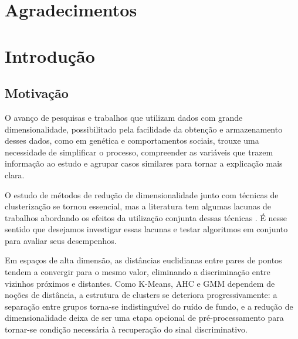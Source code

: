 \documentclass[12pt,a4paper]{report}
\begin{document}
\chapter*{Agradecimentos}


\newpage

\tableofcontents
\newpage

\setcounter{page}{1}

\chapter{Introdução}

\section{Motivação}

O avanço de pesquisas e trabalhos que utilizam dados com grande
dimensionalidade, possibilitado pela facilidade da obtenção e armazenamento
desses dados, como em genética e comportamentos sociais, trouxe uma
necessidade de simplificar o processo, compreender as variáveis que trazem
informação ao estudo e agrupar casos similares para tornar a explicação mais
clara.

O estudo de métodos de redução de dimensionalidade junto com técnicas de
clusterização se tornou essencial, mas a literatura tem algumas lacunas de
trabalhos abordando os efeitos da utilização conjunta dessas técnicas
\citep{amate2026}. É nesse sentido que desejamos investigar essas lacunas e
testar algoritmos em conjunto para avaliar seus desempenhos.

Em espaços de alta dimensão, as distâncias euclidianas entre pares de pontos
tendem a convergir para o mesmo valor, eliminando a discriminação entre
vizinhos próximos e distantes. Como K-Means, AHC e GMM dependem de noções
de distância, a estrutura de clusters se deteriora progressivamente: a
separação entre grupos torna-se indistinguível do ruído de fundo, e a
redução de dimensionalidade deixa de ser uma etapa opcional de
pré-processamento para tornar-se condição necessária à recuperação do sinal
discriminativo.
\end{document}
